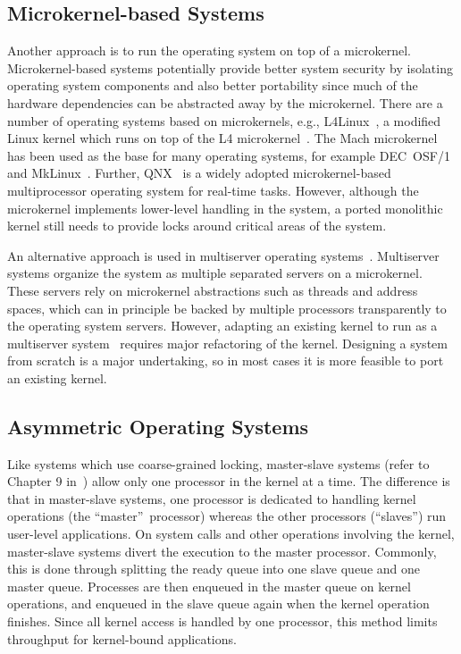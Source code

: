 \subsection{Microkernel-based Systems}
Another approach is to run the operating system on top of a microkernel.
Microkernel-based systems potentially provide better system security by
isolating operating system components and also better portability since much
of the hardware dependencies can be abstracted away by the microkernel. There
are a number of operating systems based on microkernels, e.g.,
L4Linux~\cite{l4linux}, a modified Linux kernel which runs on top of the L4
microkernel~\cite{ukernelconstruction}. The Mach microkernel has been used as
the base for many operating systems, for example DEC~OSF/1~\cite{denham94osf1}
and MkLinux~\cite{mklinux}. Further, QNX~\cite{qnx} is a widely adopted
microkernel-based multiprocessor operating system for real-time tasks.
However, although the microkernel implements lower-level handling in the
system, a ported monolithic kernel still needs to provide locks around
critical areas of the system.

An alternative approach is used in multiserver operating systems~\cite{hurd,
  roscoeroscoestructure}. Multiserver systems organize the system as multiple
separated servers on a microkernel. These servers rely on microkernel
abstractions such as threads and address spaces, which can in principle be
backed by multiple processors transparently to the operating system servers.
However, adapting an existing kernel to run as a multiserver
system~\cite{gefflaut00sawmill, rawson97experience} requires major refactoring
of the kernel. Designing a system from scratch is a major undertaking, so in
most cases it is more feasible to port an existing kernel.


\subsection{Asymmetric Operating Systems}
\label{sec:appkern:related_asymetric}
Like systems which use coarse-grained locking, master-slave systems (refer to
Chapter 9 in~\cite{schimmel94unix}) allow only one processor in the kernel
at a time. The difference is that in master-slave systems, one processor is
dedicated to handling kernel operations (the ``master''~processor) whereas the
other processors (``slaves'') run user-level applications. On system calls and
other operations involving the kernel, master-slave systems divert the
execution to the master processor. Commonly, this is done through splitting
the ready queue into one slave queue and one master queue. Processes are then
enqueued in the master queue on kernel operations, and enqueued in the slave
queue again when the kernel operation finishes. Since all kernel access is
handled by one processor, this method limits throughput for kernel-bound
applications.


